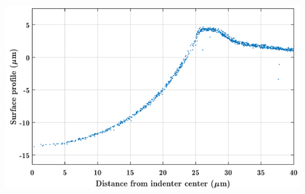 \begin{figure}
	\centering
	\includegraphics[width=\linewidth]{Chapters/Figures/sphere011_ia/side_collapsed_zoomed}
	\caption[Collapsed Side Profile: Zoomed]{}
	\label{fig:sidecollapsedzoomed}
\end{figure}


